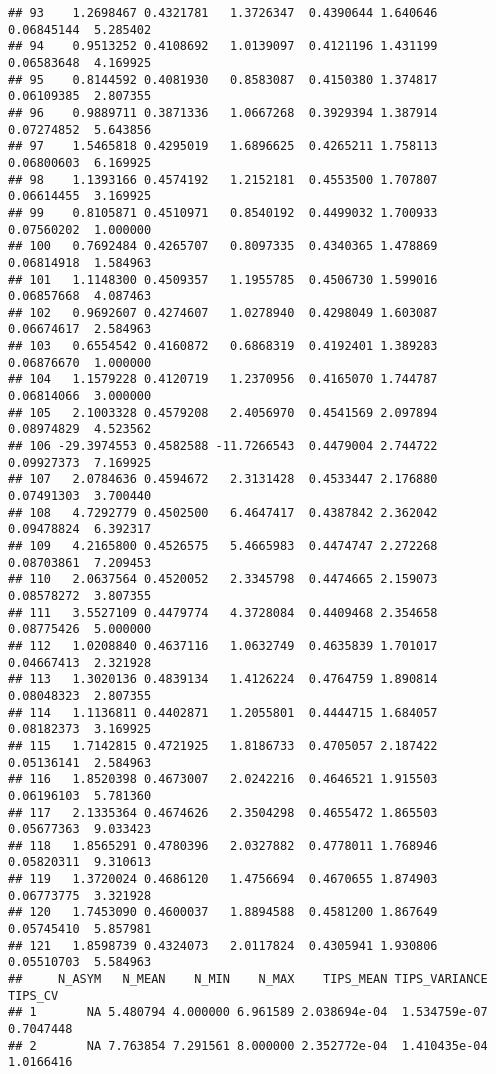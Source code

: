 \documentclass[]{article}
\begin{document}
\begin{verbatim}
## 93    1.2698467 0.4321781   1.3726347  0.4390644 1.640646 0.06845144  5.285402
## 94    0.9513252 0.4108692   1.0139097  0.4121196 1.431199 0.06583648  4.169925
## 95    0.8144592 0.4081930   0.8583087  0.4150380 1.374817 0.06109385  2.807355
## 96    0.9889711 0.3871336   1.0667268  0.3929394 1.387914 0.07274852  5.643856
## 97    1.5465818 0.4295019   1.6896625  0.4265211 1.758113 0.06800603  6.169925
## 98    1.1393166 0.4574192   1.2152181  0.4553500 1.707807 0.06614455  3.169925
## 99    0.8105871 0.4510971   0.8540192  0.4499032 1.700933 0.07560202  1.000000
## 100   0.7692484 0.4265707   0.8097335  0.4340365 1.478869 0.06814918  1.584963
## 101   1.1148300 0.4509357   1.1955785  0.4506730 1.599016 0.06857668  4.087463
## 102   0.9692607 0.4274607   1.0278940  0.4298049 1.603087 0.06674617  2.584963
## 103   0.6554542 0.4160872   0.6868319  0.4192401 1.389283 0.06876670  1.000000
## 104   1.1579228 0.4120719   1.2370956  0.4165070 1.744787 0.06814066  3.000000
## 105   2.1003328 0.4579208   2.4056970  0.4541569 2.097894 0.08974829  4.523562
## 106 -29.3974553 0.4582588 -11.7266543  0.4479004 2.744722 0.09927373  7.169925
## 107   2.0784636 0.4594672   2.3131428  0.4533447 2.176880 0.07491303  3.700440
## 108   4.7292779 0.4502500   6.4647417  0.4387842 2.362042 0.09478824  6.392317
## 109   4.2165800 0.4526575   5.4665983  0.4474747 2.272268 0.08703861  7.209453
## 110   2.0637564 0.4520052   2.3345798  0.4474665 2.159073 0.08578272  3.807355
## 111   3.5527109 0.4479774   4.3728084  0.4409468 2.354658 0.08775426  5.000000
## 112   1.0208840 0.4637116   1.0632749  0.4635839 1.701017 0.04667413  2.321928
## 113   1.3020136 0.4839134   1.4126224  0.4764759 1.890814 0.08048323  2.807355
## 114   1.1136811 0.4402871   1.2055801  0.4444715 1.684057 0.08182373  3.169925
## 115   1.7142815 0.4721925   1.8186733  0.4705057 2.187422 0.05136141  2.584963
## 116   1.8520398 0.4673007   2.0242216  0.4646521 1.915503 0.06196103  5.781360
## 117   2.1335364 0.4674626   2.3504298  0.4655472 1.865503 0.05677363  9.033423
## 118   1.8565291 0.4780396   2.0327882  0.4778011 1.768946 0.05820311  9.310613
## 119   1.3720024 0.4686120   1.4756694  0.4670655 1.874903 0.06773775  3.321928
## 120   1.7453090 0.4600037   1.8894588  0.4581200 1.867649 0.05745410  5.857981
## 121   1.8598739 0.4324073   2.0117824  0.4305941 1.930806 0.05510703  5.584963
##     N_ASYM   N_MEAN    N_MIN    N_MAX    TIPS_MEAN TIPS_VARIANCE   TIPS_CV
## 1       NA 5.480794 4.000000 6.961589 2.038694e-04  1.534759e-07 0.7047448
## 2       NA 7.763854 7.291561 8.000000 2.352772e-04  1.410435e-04 1.0166416

\end{verbatim}
\end{document}
